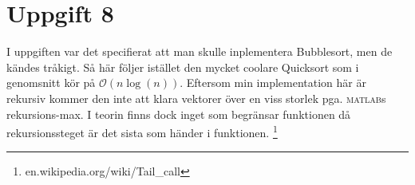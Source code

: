 \documentclass[a4paper,11pt]{article}
\begin{document}
    \section*{Uppgift 8}
    I uppgiften var det specifierat att man skulle inplementera Bubblesort,
    men de kändes tråkigt. Så här följer istället den mycket coolare Quicksort
     som i genomsnitt kör på
    $\mathcal{O}(n \log(n))$.
    Eftersom min implementation här är rekursiv kommer den inte att klara
    vektorer över en viss storlek pga. \textsc{matlab}s rekursions-max.
    I teorin finns dock inget som begränsar funktionen då rekursionssteget
    är det sista som händer i funktionen.
    \footnote{en.wikipedia.org/wiki/Tail\_call}
\end{document}
